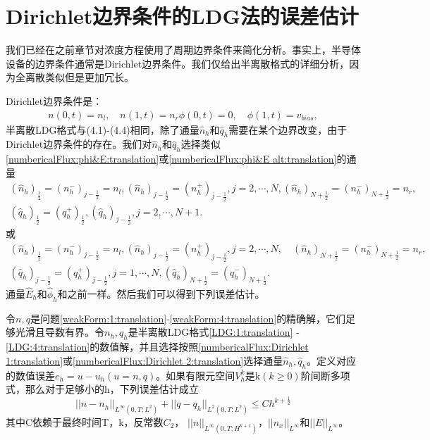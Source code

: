 \section{Dirichlet边界条件的LDG法的误差估计}
我们已经在之前章节对浓度方程使用了周期边界条件来简化分析。事实上，半导体设备的边界条件通常是Dirichlet边界条件。我们仅给出半离散格式的详细分析，因为全离散类似但是更加冗长。

Dirichlet边界条件是：
\begin{align}
    n(0,t) = n_l,\quad n(1,t) = n_r
    \phi(0,t) = 0, \quad \phi(1,t) = v_{bias},
\end{align}
半离散LDG格式与(4.1)-(4.4)相同，除了通量$\hat{n}_h$和$\hat{q}_h$需要在某个边界改变，由于Dirichlet边界条件的存在。我们对$\hat{n}_h$和$\hat{q}_h$选择类似\eqref{numbericalFlux:phi&E:translation}或\eqref{numbericalFlux:phi&E alt:translation}的通量
\begin{align}
    (\hat{n}_h)_{\frac{1}{2}} = (n_h^-)_{j-\frac{1}{2}} =n_l, (\hat{n}_h)_{j-\frac{1}{2}} =  (n_h^+)_{j-\frac{1}{2}},j=2,\cdots,N,  (\hat{n}_h)_{N+\frac{1}{2}} = (n_h^-)_{N+\frac{1}{2}} = n_r, \nonumber \\
    (\hat{q}_h)_{\frac{1}{2}} = (q_h^+)_{\frac{1}{2}}, (\hat{q}_h)_{j-\frac{1}{2}},j=2,\cdots,N+1. \label{numbericalFlux:Dirichlet 1:translation}
\end{align}
或
\begin{align}
    (\hat{n}_h)_{\frac{1}{2}} = (n_h^-)_{j-\frac{1}{2}} = n_l, (\hat{n}_h)_{j-\frac{1}{2}} = (n_h^+)_{j-\frac{1}{2}},j=2,\cdots,N,\quad (\hat{n}_h)_{N+\frac{1}{2}} = (n_h^-)_{N+\frac{1}{2}} = n_r, \nonumber \\
    (\hat{q}_h)_{j - \frac{1}{2}} = (q_h^+)_{j - \frac{1}{2}}, j = 1,\cdots,N,(\hat{q}_h)_{N+\frac{1}{2}} = (q_h^-)_{N+\frac{1}{2}}.\label{numbericalFlux:Dirichlet 2:translation}
\end{align}
通量$\hat{E}_h$和$\hat{\phi}_h$和之前一样。然后我们可以得到下列误差估计。
\begin{theorem}\label{theo:6.1:translation}
    令$n,q$是问题\eqref{weakForm:1:translation}-\eqref{weakForm:4:translation}的精确解，它们足够光滑且导数有界。令$n_h,q_h$是半离散LDG格式\eqref{LDG:1:translation} - \ref{LDG:4:translation}的数值解，并且选择按照\eqref{numbericalFlux:Dirichlet 1:translation}或\eqref{numbericalFlux:Dirichlet 2:translation}选择通量$\hat{n}_h,\hat{q}_h$。定义对应的数值误差$e_h = u-u_h(u = n,q)$。如果有限元空间$V_h^k$是k$(k\geq  0)$阶间断多项式，那么对于足够小的h，下列误差估计成立
    \begin{equation}
        ||n-n_h||_{L^{\infty}(0,T;L^2)} + ||q - q_h||_{L^2(0,T;L^2)} \leq Ch^{k+\frac{1}{2}}
    \end{equation}
    其中C依赖于最终时间T，k，反常数$C_2$， $||n||_{L^{\infty}(0,T;H^{k+1})}$，$||n_x||_{L^{\infty}}$和$||E||_{L^{\infty}}$。
\end{theorem}
